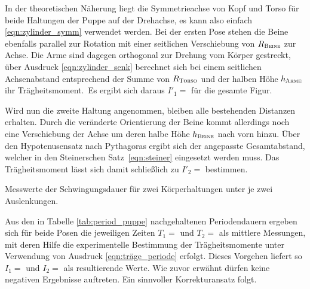 In der theoretischen Näherung liegt die Symmetrieachse von Kopf und Torso für beide Haltungen der Puppe auf der Drehachse,
es kann also einfach \eqref{eqn:zylinder_symm} verwendet werden. Bei der ersten Pose stehen die Beine ebenfalls parallel zur
Rotation mit einer seitlichen Verschiebung von $R_\textsc{Beine}$ zur Achse. Die Arme sind dagegen orthogonal zur Drehung
vom Körper gestreckt, über Ausdruck \eqref{eqn:zylinder_senk} berechnet sich bei einem seitlichen Achsenabstand entsprechend
der Summe von $R_\textsc{Torso}$ und der halben Höhe $h_\textsc{\hspace{-0.15ex}Arme}$ ihr Trägheitsmoment.~Es ergibt sich
daraus $I'_1 = $ für die gesamte Figur.

Wird nun die zweite Haltung angenommen, bleiben alle bestehenden Distanzen erhalten. Durch die veränderte Orientierung
der Beine kommt allerdings noch eine Verschiebung der Achse um deren halbe Höhe $h_\textsc{Beine}$ nach vorn hinzu.
Über den Hypotenusensatz nach Pythagoras ergibt sich der angepasste Gesamtabstand, welcher in den Steinerschen
Satz~\eqref{eqn:steiner} eingesetzt werden muss. Das Trägheitsmoment lässt sich damit schließlich zu
$I'_2 = $ bestimmen.

\begin{table}
	\centering
	\captionsetup{width=0.725\linewidth}
	\caption{Messwerte der Schwingungsdauer für zwei Körperhaltungen unter je zwei Auslenkungen.}
	
	\label{tab:period_puppe}
\end{table}

Aus den in Tabelle \ref{tab:period_puppe} nachgehaltenen Periodendauern ergeben sich für beide Posen die
jeweiligen Zeiten $T_1 = $ und $T_2 = $ als mittlere Messungen, mit deren Hilfe
die experimentelle Bestimmung der Trägheitsmomente unter Verwendung von Ausdruck \eqref{eqn:träge_periode} erfolgt. Dieses
Vorgehen liefert so $I_1 = $ und $I_2 = $ als resultierende Werte.
Wie zuvor erwähnt dürfen keine negativen Ergebnisse auftreten. Ein sinnvoller Korrekturansatz folgt.
\enlargethispage{\baselineskip}\newpage


